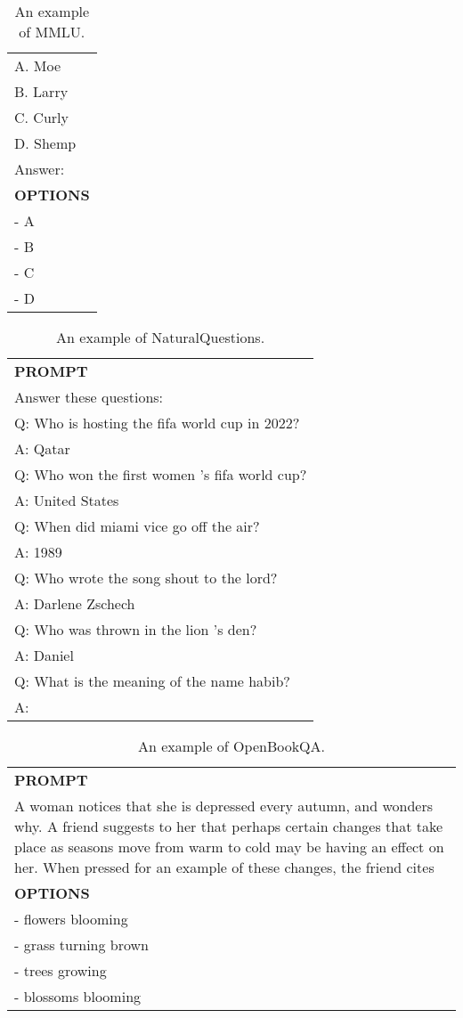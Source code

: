 \begin{table}[ht]
\begin{tabular}{p{12cm}}
A. Moe\\
B. Larry\\
C. Curly\\
D. Shemp\\
Answer:\\
\midrule
\textbf{OPTIONS}\\
- A\\
- B\\
- C\\
- D\\
\bottomrule
\end{tabular}
    \caption{\centering An example of MMLU.}
    \label{tab:mmlu_eval_format_example}
\end{table}

\begin{table}[ht]
    \centering \small
\begin{tabular}{p{12cm}}
\toprule
\textbf{PROMPT}\\
Answer these questions:\\
Q: Who is hosting the fifa world cup in 2022?\\
A: Qatar\\
Q: Who won the first women 's fifa world cup?\\
A: United States\\
Q: When did miami vice go off the air?\\
A: 1989\\
Q: Who wrote the song shout to the lord?\\
A: Darlene Zschech\\
Q: Who was thrown in the lion 's den?\\
A: Daniel\\
Q: What is the meaning of the name habib?\\
A:\\
\bottomrule
\end{tabular}
    \caption{\centering An example of NaturalQuestions.}
    \label{tab:naturalquestions_eval_format_example}
\end{table}

\begin{table}[ht]
    \centering \small
\begin{tabular}{p{12cm}}
\toprule
\textbf{PROMPT}\\
A woman notices that she is depressed every autumn, and wonders why. A friend suggests to her that perhaps certain changes that take place as seasons move from warm to cold may be having an effect on her. When pressed for an example of these changes, the friend cites\\
\midrule
\textbf{OPTIONS}\\
- flowers blooming\\
- grass turning brown\\
- trees growing\\
- blossoms blooming\\
\bottomrule
\end{tabular}
    \caption{\centering An example of OpenBookQA.}
    \label{tab:openbookqa_eval_format_example}
\end{table}

